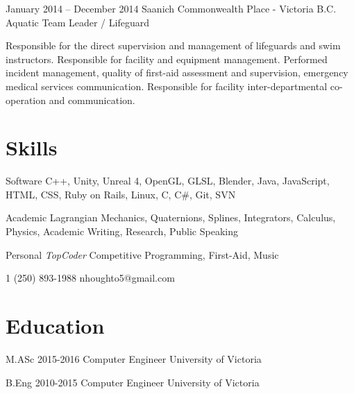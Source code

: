 \documentclass{tccv}
\begin{document}
\begin{eventlist}
\item{January 2014 – December 2014}
     {Saanich Commonwealth Place - Victoria B.C.}
     {Aquatic Team Leader / Lifeguard}

Responsible for the direct supervision and management of lifeguards and swim instructors. Responsible for facility and equipment management. Performed incident management, quality of first-aid assessment and supervision, emergency medical services communication. Responsible for facility inter-departmental co-operation and communication.



\section{Skills}
\begin{factlist}
	
	\item{Software}
	{C++, Unity, Unreal 4, OpenGL, GLSL, Blender, Java, JavaScript, HTML, CSS, Ruby on Rails, Linux, C, C\#, Git, SVN}
	
	\item{Academic}
	{Lagrangian Mechanics, Quaternions, Splines, Integrators, Calculus, Physics, Academic Writing, Research, Public Speaking}
	
	\item{Personal}
	{\textit{TopCoder} Competitive Programming, First-Aid, Music}
	
\end{factlist}
\end{eventlist}

    {1 (250) 893-1988}
    {nhoughto5@gmail.com}

\section{Education}

\begin{yearlist}

\item[M.ASc]{2015-2016}
	{Computer Engineer}
	{University of Victoria}
\item[B.Eng]{2010-2015}
     {Computer Engineer}
     {University of Victoria}

\end{yearlist}
\end{document}
